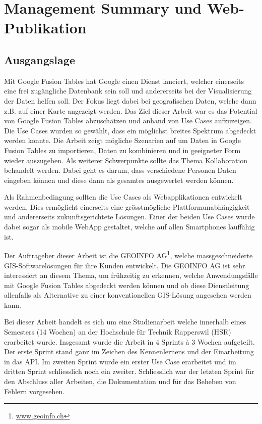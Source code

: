\chapter*{Management Summary und Web-Publikation}

\section*{Ausgangslage}
Mit Google Fusion Tables hat Google einen Dienst lanciert, welcher einerseits eine frei zugängliche Datenbank sein soll und andererseits bei der Visualisierung der Daten helfen soll. Der Fokus liegt dabei bei geografischen Daten, welche dann z.B. auf einer Karte angezeigt werden.
Das Ziel dieser Arbeit war es das Potential von Google Fusion Tables abzuschätzen und anhand von Use Cases aufzuzeigen. Die Use Cases wurden so gewählt, dass ein möglichst breites Spektrum abgedeckt werden konnte. Die Arbeit zeigt mögliche Szenarien auf um Daten in Google Fusion Tables zu importieren, Daten zu kombinieren und in geeigneter Form wieder auszugeben. Als weiterer Schwerpunkte sollte das Thema Kollaboration behandelt werden. Dabei geht es darum, dass verschiedene Personen Daten eingeben können und diese dann als gesamtes ausgewertet werden können.

Als Rahmenbedingung sollten die Use Cases als Webapplikationen entwickelt werden. Dies ermöglicht einerseits eine grösstmögliche Plattformunabhängigkeit und andererseits zukunftsgerichtete Lösungen. Einer der beiden Use Cases wurde dabei sogar als mobile WebApp gestaltet, welche auf allen Smartphones lauffähig ist.

Der Auftrageber dieser Arbeit ist die GEOINFO AG\footnote{\url{www.geoinfo.ch}}, welche massgeschneiderte \gls{GIS}-Softwarelösungen für ihre Kunden entwickelt. Die GEOINFO AG ist sehr interessiert an diesem Thema, um frühzeitig zu erkennen, welche Anwendungsfälle mit Google Fusion Tables abgedeckt werden können und ob diese Dienstleitung allenfalls als Alternative zu einer konventionellen \gls{GIS}-Lösung angesehen werden kann.

Bei dieser Arbeit handelt es sich um eine Studienarbeit welche innerhalb eines Semesters (14 Wochen) an der Hochschule für Technik Rapperswil (HSR) erarbeitet wurde. Insgesamt wurde die Arbeit in 4 Sprints à 3 Wochen aufgeteilt. Der erste Sprint stand ganz im Zeichen des Kennenlernens und der Einarbeitung in das \gls{API}. Im zweiten Sprint wurde ein erster Use Case erarbeitet und im dritten Sprint schliesslich noch ein zweiter. Schliesslich war der letzten Sprint für den Abschluss aller Arbeiten, die Dokumentation und für das Beheben von Fehlern vorgesehen.


